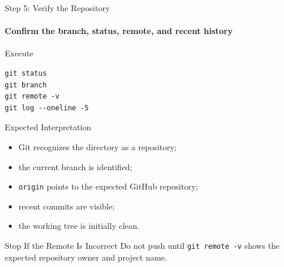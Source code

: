 \begin{frame}[fragile]{Step 5: Verify the Repository}
\framesubtitle{Confirm the branch, status, remote, and recent history}

\footnotesize

\begin{block}{Execute}
\begin{verbatim}
git status
git branch
git remote -v
git log --oneline -5
\end{verbatim}
\end{block}

\begin{exampleblock}{Expected Interpretation}
\begin{itemize}
    \setlength{\itemsep}{0.16em}
    \item Git recognizes the directory as a repository;
    \item the current branch is identified;
    \item \texttt{origin} points to the expected GitHub repository;
    \item recent commits are visible;
    \item the working tree is initially clean.
\end{itemize}
\end{exampleblock}

\begin{alertblock}{Stop If the Remote Is Incorrect}
Do not push until \texttt{git remote -v} shows the expected repository
owner and project name.
\end{alertblock}

\end{frame}

